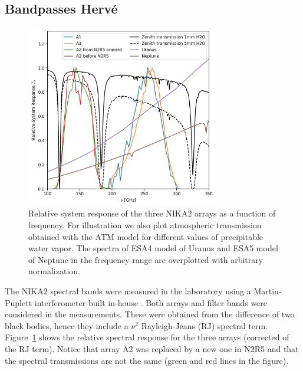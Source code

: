 


\subsection{Bandpasses {\color{blue} Herv\'e} }
\label{se:bandpasses}

\begin{figure}[ht!] %
\begin{center}
\includegraphics[width=0.75\textwidth]{Figures/SpectralBands/bandpasses_nika2.png}
\caption[NIKA2 transmission]{Relative system response of the three NIKA2 arrays as a
  function of frequency. For illustration we also plot atmospheric transmission obtained with the ATM model 
 \cite{ATM} for different values of precipitable water vapor. The spectra of ESA4 model of Uranus and ESA5 model of Neptune \cite{ESAmodel} in the frequency range are overplotted with arbitrary normalization.} 
 \label{spectralband1}
\end{center}
\end{figure}

 

The NIKA2 spectral bands were measured in the laboratory using a
Martin-Puplett interferometer built in-house \cite{durand}.  Both
arrays and filter bands were considered in the measurements. These
were obtained from the difference of two black bodies, hence they
include a $\nu^2$ Rayleigh-Jeans (RJ) spectral term.
Figure~\ref{spectralband1} shows the relative spectral response for
the three arrays (corrected of the RJ term).  Notice that array A2 was
replaced by a new one in N2R5 and that the spectral transmissions are
not the same (green and red lines in the figure).

